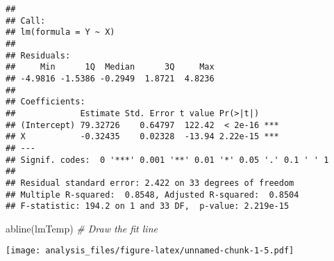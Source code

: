 \documentclass[
]{article}
\newenvironment{Shaded}{\begin{snugshade}}{\end{snugshade}}
\newcommand{\CommentTok}[1]{\textcolor[rgb]{0.56,0.35,0.01}{\textit{#1}}}
\newcommand{\FunctionTok}[1]{\textcolor[rgb]{0.00,0.00,0.00}{#1}}
\newcommand{\NormalTok}[1]{#1}
\begin{document}
\begin{verbatim}
## 
## Call:
## lm(formula = Y ~ X)
## 
## Residuals:
##     Min      1Q  Median      3Q     Max 
## -4.9816 -1.5386 -0.2949  1.8721  4.8236 
## 
## Coefficients:
##             Estimate Std. Error t value Pr(>|t|)    
## (Intercept) 79.32726    0.64797  122.42  < 2e-16 ***
## X           -0.32435    0.02328  -13.94 2.22e-15 ***
## ---
## Signif. codes:  0 '***' 0.001 '**' 0.01 '*' 0.05 '.' 0.1 ' ' 1
## 
## Residual standard error: 2.422 on 33 degrees of freedom
## Multiple R-squared:  0.8548, Adjusted R-squared:  0.8504 
## F-statistic: 194.2 on 1 and 33 DF,  p-value: 2.219e-15
\end{verbatim}

\begin{Shaded}
\begin{Highlighting}[]
\FunctionTok{abline}\NormalTok{(lmTemp)  }\CommentTok{\# Draw the fit line}
\end{Highlighting}
\end{Shaded}

\texttt{[image: analysis\_files/figure-latex/unnamed-chunk-1-5.pdf]}
\end{document}

